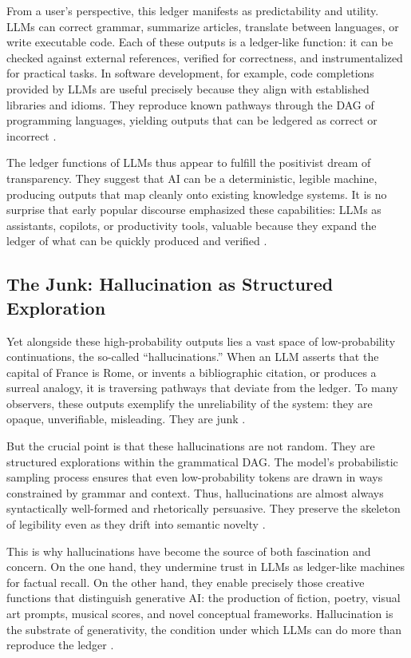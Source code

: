 \documentclass[12pt]{article}
\begin{document}
From a user’s perspective, this ledger manifests as predictability and utility. LLMs can correct grammar, summarize articles, translate between languages, or write executable code. Each of these outputs is a ledger-like function: it can be checked against external references, verified for correctness, and instrumentalized for practical tasks. In software development, for example, code completions provided by LLMs are useful precisely because they align with established libraries and idioms. They reproduce known pathways through the DAG of programming languages, yielding outputs that can be ledgered as correct or incorrect \citep{chen2021}.

The ledger functions of LLMs thus appear to fulfill the positivist dream of transparency. They suggest that AI can be a deterministic, legible machine, producing outputs that map cleanly onto existing knowledge systems. It is no surprise that early popular discourse emphasized these capabilities: LLMs as assistants, copilots, or productivity tools, valuable because they expand the ledger of what can be quickly produced and verified \citep{bommasani2021}.

\subsection{The Junk: Hallucination as Structured Exploration}
Yet alongside these high-probability outputs lies a vast space of low-probability continuations, the so-called ``hallucinations.'' When an LLM asserts that the capital of France is Rome, or invents a bibliographic citation, or produces a surreal analogy, it is traversing pathways that deviate from the ledger. To many observers, these outputs exemplify the unreliability of the system: they are opaque, unverifiable, misleading. They are junk \citep{bender2021}.

But the crucial point is that these hallucinations are not random. They are structured explorations within the grammatical DAG. The model’s probabilistic sampling process ensures that even low-probability tokens are drawn in ways constrained by grammar and context. Thus, hallucinations are almost always syntactically well-formed and rhetorically persuasive. They preserve the skeleton of legibility even as they drift into semantic novelty \citep{shanahan2023}.

This is why hallucinations have become the source of both fascination and concern. On the one hand, they undermine trust in LLMs as ledger-like machines for factual recall. On the other hand, they enable precisely those creative functions that distinguish generative AI: the production of fiction, poetry, visual art prompts, musical scores, and novel conceptual frameworks. Hallucination is the substrate of generativity, the condition under which LLMs can do more than reproduce the ledger \citep{hofstadter1995}.
\end{document}
